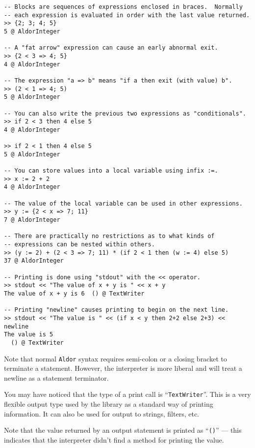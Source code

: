 \documentclass{article}
\newcommand{\Aldor}{{\tt Aldor}}
\begin{document}
\begin{small}
\begin{verbatim}
-- Blocks are sequences of expressions enclosed in braces.  Normally
-- each expression is evaluated in order with the last value returned.
>> {2; 3; 4; 5}
5 @ AldorInteger

-- A "fat arrow" expression can cause an early abnormal exit.
>> {2 < 3 => 4; 5}
4 @ AldorInteger

-- The expression "a => b" means "if a then exit (with value) b".
>> (2 < 1 => 4; 5)
5 @ AldorInteger

-- You can also write the previous two expressions as "conditionals".
>> if 2 < 3 then 4 else 5
4 @ AldorInteger

>> if 2 < 1 then 4 else 5
5 @ AldorInteger

-- You can store values into a local variable using infix :=.
>> x := 2 + 2
4 @ AldorInteger

-- The value of the local variable can be used in other expressions.
>> y := {2 < x => 7; 11}
7 @ AldorInteger

-- There are practically no restrictions as to what kinds of 
-- expressions can be nested within others.
>> (y := 2) + (2 < 3 => 7; 11) * (if 2 < 1 then (w := 4) else 5)
37 @ AldorInteger

-- Printing is done using "stdout" with the << operator.
>> stdout << "The value of x + y is " << x + y
The value of x + y is 6  () @ TextWriter

-- Printing "newline" causes printing to begin on the next line.
>> stdout << "The value is " << (if x < y then 2+2 else 2+3) << newline
The value is 5
  () @ TextWriter

\end{verbatim}
\end{small}

Note that normal \Aldor{} syntax requires semi-colon or a closing
bracket to terminate a statement.  However, the interpreter is more
liberal and will treat a newline as a statement terminator.

You may have noticed that the type of a print call is ``{\tt TextWriter}''.
This is a very flexible output type used by the
library as a standard way of printing information.  It can also be
used for output to strings, filters, etc.

Note that the value returned by an output statement is printed as
``{\tt ()}'' --- this indicates that the interpreter didn't find a
method for printing the value.
\end{document}
